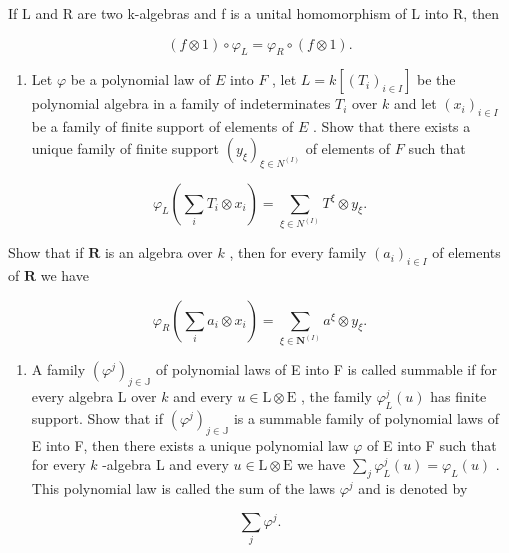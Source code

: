 If L and R are two k-algebras and f is a unital homomorphism of L into R, then

\[
(f \otimes 1) \circ \varphi_ {L} = \varphi_ {R} \circ (f \otimes 1).
\]

\begin{enumerate}
\def\labelenumi{\alph{enumi})}
\tightlist
\item
  Let \(\varphi\) be a polynomial law of \(E\) into \(F\) , let \(L = k[(T_i)_{i \in I}]\) be the polynomial algebra in a family of indeterminates \(T_i\) over \(k\) and let \((x_i)_{i \in I}\) be a family of finite support of elements of \(E\) . Show that there exists a unique family of finite support \((y_\xi)_{\xi \in N^{(I)}}\) of elements of \(F\) such that
\end{enumerate}

\[
\varphi_ {L} \left(\sum_ {i} T _ {i} \otimes x _ {i}\right) = \sum_ {\xi \in N ^ {(I)}} T ^ {\xi} \otimes y _ {\xi}.
\]

Show that if \(\mathbf{R}\) is an algebra over \(k\) , then for every family \((a_i)_{i \in I}\) of elements of \(\mathbf{R}\) we have

\[
\varphi_ {R} \left(\sum_ {i} a _ {i} \otimes x _ {i}\right) = \sum_ {\xi \in \mathbf {N} ^ {(I)}} a ^ {\xi} \otimes y _ {\xi}.\tag{1}
\]

\begin{enumerate}
\def\labelenumi{\alph{enumi})}
\setcounter{enumi}{1}
\tightlist
\item
  A family \((\varphi^j)_{j \in \mathbb{J}}\) of polynomial laws of E into F is called summable if for every algebra L over \(k\) and every \(u \in \mathrm{L} \otimes \mathrm{E}\) , the family \(\varphi_L^j(u)\) has finite support. Show that if \((\varphi^j)_{j \in \mathbb{J}}\) is a summable family of polynomial laws of E into F, then there exists a unique polynomial law \(\varphi\) of E into F such that for every \(k\) -algebra L and every \(u \in \mathrm{L} \otimes \mathrm{E}\) we have \(\sum_j \varphi_L^j(u) = \varphi_L(u)\) . This polynomial law is called the sum of the laws \(\varphi^j\) and is denoted by
\end{enumerate}

\[
\sum_ {j} \varphi^ {j}.
\]

